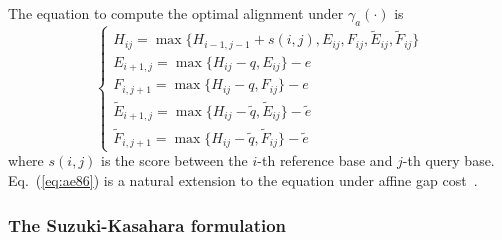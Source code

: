 \documentclass{bioinfo}
\begin{document}
\begin{methods}
The equation to compute the optimal alignment under $\gamma_a(\cdot)$ is
\begin{equation}\label{eq:ae86}
\left\{\begin{array}{l}
H_{ij} = \max\{H_{i-1,j-1}+s(i,j),E_{ij},F_{ij},\tilde{E}_{ij},\tilde{F}_{ij}\}\\
E_{i+1,j}= \max\{H_{ij}-q,E_{ij}\}-e\\
F_{i,j+1}= \max\{H_{ij}-q,F_{ij}\}-e\\
\tilde{E}_{i+1,j}= \max\{H_{ij}-\tilde{q},\tilde{E}_{ij}\}-\tilde{e}\\
\tilde{F}_{i,j+1}= \max\{H_{ij}-\tilde{q},\tilde{F}_{ij}\}-\tilde{e}
\end{array}\right.
\end{equation}
where $s(i,j)$ is the score between the $i$-th reference base and $j$-th query
base. Eq.~(\ref{eq:ae86}) is a natural extension to the equation under affine
gap cost~\citep{Gotoh:1982aa,Altschul:1986aa}.

\subsubsection{The Suzuki-Kasahara formulation}


\end{methods}
\end{document}
